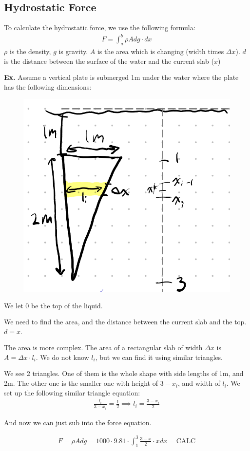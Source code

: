 \documentclass[12pt,letterpaper]{article} \usepackage{amsmath} \usepackage{graphicx}  \usepackage{longtable}  \usepackage{amssymb}
\begin{document}
        \subsection{Hydrostatic Force}
        To calculate the hydrostatic force, we use the following formula:
        \begin{align*}
            F = \int^b_a \rho Adg\cdot dx
        \end{align*}
        $\rho$ is the density, $g$ is gravity. $A$ is the area which is changing (width times $\Delta x$). $d$ is the distance between the surface of the water and the current slab ($x$)

        \begin{mdframed}
            \textbf{Ex. } Assume a vertical plate is submerged 1m under the water where the plate has the following dimensions:

            \begin{figure}[H]
                \centering
                \includegraphics[width=0.4\linewidth]{ex6.png}
            \end{figure}

            We let $0$ be the top of the liquid. 

            We need to find the area, and the distance between the current slab and the top. $d=x$.

            The area is more complex. The area of a rectangular slab of width $\Delta x$ is $A = \Delta x \cdot l_i$. We do not know $l_i$, but we can find it using similar triangles. 

            We see 2 triangles. One of them is the whole shape with side lengths of 1m, and 2m. The other one is the smaller one with height of $3-x_i$, and width of $l_i$. We set up the following similar triangle equation:
            \begin{align*}
                \frac{l_i}{3-x_i} = \frac{1}{2} \implies l_i = \frac{3-x_i}{2}
            \end{align*}

            And now we can just sub into the force equation. 

            \begin{align*}
                F = \rho A d g = 1000\cdot 9.81\cdot \int^3_1 \frac{3-x}{2} \cdot x dx = \text{CALC}
            \end{align*}

        \end{mdframed}
\end{document}
